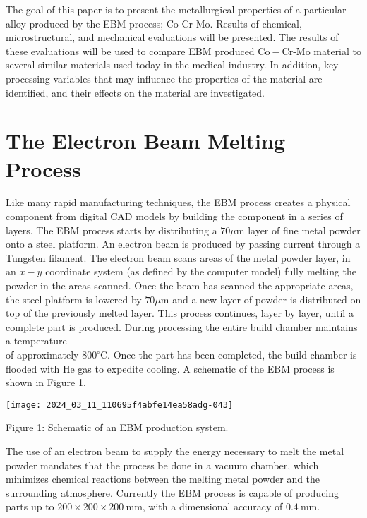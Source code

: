 \documentclass[10pt]{article}
\begin{document}
The goal of this paper is to present the metallurgical properties of a particular alloy produced by the EBM process; Co-Cr-Mo. Results of chemical, microstructural, and mechanical evaluations will be presented. The results of these evaluations will be used to compare EBM produced $\mathrm{Co}-\mathrm{Cr}$-Mo material to several similar materials used today in the medical industry. In addition, key processing variables that may influence the properties of the material are identified, and their effects on the material are investigated.

\section*{The Electron Beam Melting Process}
Like many rapid manufacturing techniques, the EBM process creates a physical component from digital CAD models by building the component in a series of layers. The EBM process starts by distributing a $70 \mu \mathrm{m}$ layer of fine metal powder onto a steel platform. An electron beam is produced by passing current through a Tungsten filament. The electron beam scans areas of the metal powder layer, in an $x-y$ coordinate system (as defined by the computer model) fully melting the powder in the areas scanned. Once the beam has scanned the appropriate areas, the steel platform is lowered by $70 \mu \mathrm{m}$ and a new layer of powder is distributed on top of the previously melted layer. This process continues, layer by layer, until a complete part is produced. During processing the entire build chamber maintains a temperature\\
of approximately $800^{\circ} \mathrm{C}$. Once the part has been completed, the build chamber is flooded with He gas to expedite cooling. A schematic of the EBM process is shown in Figure 1.

\begin{center}
\texttt{[image: 2024\_03\_11\_110695f4abfe14ea58adg-043]}
\end{center}

Figure 1: Schematic of an EBM production system.

The use of an electron beam to supply the energy necessary to melt the metal powder mandates that the process be done in a vacuum chamber, which minimizes chemical reactions between the melting metal powder and the surrounding atmosphere. Currently the EBM process is capable of producing parts up to $200 \times 200 \times 200 \mathrm{~mm}$, with a dimensional accuracy of $0.4 \mathrm{~mm}$.
\end{document}
